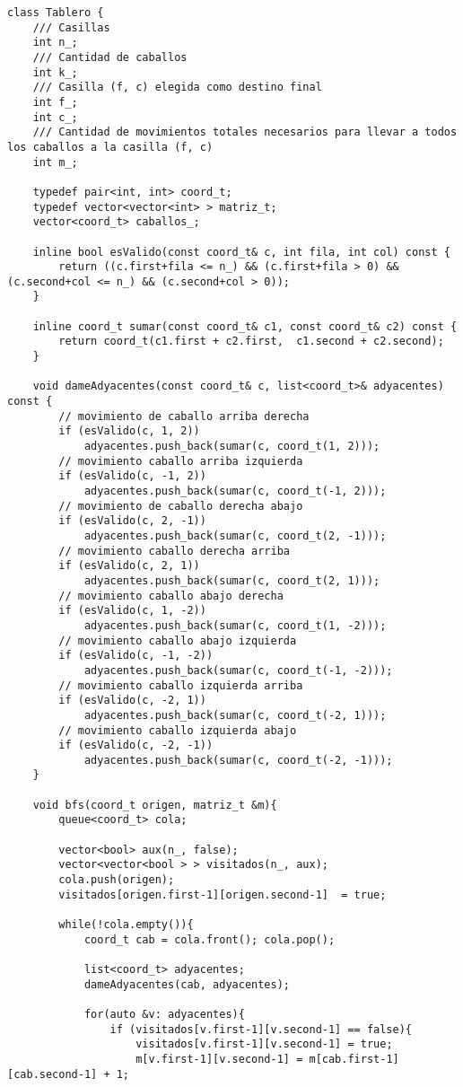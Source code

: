 \begin{frame}

\begin{lstlisting}
class Tablero {
	/// Casillas
	int n_;
	/// Cantidad de caballos
	int k_;
	/// Casilla (f, c) elegida como destino final
	int f_;
	int c_;
	/// Cantidad de movimientos totales necesarios para llevar a todos los caballos a la casilla (f, c)
	int m_;
    
	typedef pair<int, int> coord_t;
	typedef vector<vector<int> > matriz_t;
	vector<coord_t> caballos_;

	inline bool esValido(const coord_t& c, int fila, int col) const {
		return ((c.first+fila <= n_) && (c.first+fila > 0) && (c.second+col <= n_) && (c.second+col > 0));
	}

	inline coord_t sumar(const coord_t& c1, const coord_t& c2) const {
		return coord_t(c1.first + c2.first,  c1.second + c2.second);
	}

	void dameAdyacentes(const coord_t& c, list<coord_t>& adyacentes) const {
		// movimiento de caballo arriba derecha
		if (esValido(c, 1, 2))
			adyacentes.push_back(sumar(c, coord_t(1, 2)));
		// movimiento caballo arriba izquierda
		if (esValido(c, -1, 2))
			adyacentes.push_back(sumar(c, coord_t(-1, 2)));
		// movimiento de caballo derecha abajo
		if (esValido(c, 2, -1))
			adyacentes.push_back(sumar(c, coord_t(2, -1)));
		// movimiento caballo derecha arriba
		if (esValido(c, 2, 1))
			adyacentes.push_back(sumar(c, coord_t(2, 1)));
		// movimiento caballo abajo derecha
		if (esValido(c, 1, -2))
			adyacentes.push_back(sumar(c, coord_t(1, -2)));
		// movimiento caballo abajo izquierda
		if (esValido(c, -1, -2))
			adyacentes.push_back(sumar(c, coord_t(-1, -2)));
		// movimiento caballo izquierda arriba
		if (esValido(c, -2, 1))
			adyacentes.push_back(sumar(c, coord_t(-2, 1)));
		// movimiento caballo izquierda abajo
		if (esValido(c, -2, -1))
			adyacentes.push_back(sumar(c, coord_t(-2, -1)));
	}

	void bfs(coord_t origen, matriz_t &m){
		queue<coord_t> cola;

		vector<bool> aux(n_, false);
		vector<vector<bool > > visitados(n_, aux);
		cola.push(origen);
		visitados[origen.first-1][origen.second-1]  = true;
		
		while(!cola.empty()){
			coord_t cab = cola.front(); cola.pop();

			list<coord_t> adyacentes;
			dameAdyacentes(cab, adyacentes);

			for(auto &v: adyacentes){
				if (visitados[v.first-1][v.second-1] == false){
					visitados[v.first-1][v.second-1] = true;
					m[v.first-1][v.second-1] = m[cab.first-1][cab.second-1] + 1;


\end{lstlisting}
\end{frame}
